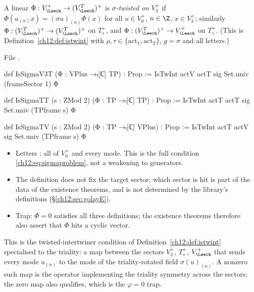 \begin{definition}\label{ch12:def:issigma}
A linear $\Phi:V_\Leech^+\to(V_\Leech^T)^+$ is \emph{$\sigma$-twisted on $V_3^+$} if
$\Phi(u_{(n)}x)=(\sigma u)_{(n)}\Phi(x)$ for all $u\in V_0^+$, $n\in\Z$, $x\in V_3^+$; similarly
$\Phi:(V_\Leech^T)^+\to(V_\Leech^T)^+$ on $T_s^+$, and $\Phi:(V_\Leech^T)^+\to V_\Leech^+$ on $T_s^+$.  (This is
Definition~\ref{ch12:def:istwint} with $\rho,\tau\in\{\mathrm{act}_V,\mathrm{act}_T\}$, $g=\sigma$ and all letters.)
\end{definition}
File .
\begin{leancode}
def IsSigmaV3T (Φ : VPlus →ₗ[ℂ] TP) : Prop :=
  IsTwInt actV actT sig Set.univ (frameSector 1) Φ

def IsSigmaTT (s : ZMod 2) (Φ : TP →ₗ[ℂ] TP) : Prop :=
  IsTwInt actT actT sig Set.univ (TPframe s) Φ

def IsSigmaTV (s : ZMod 2) (Φ : TP →ₗ[ℂ] VPlus) : Prop :=
  IsTwInt actT actV sig Set.univ (TPframe s) Φ
\end{leancode}
\begin{dictionary}
\begin{itemize}
\item Letters : all of $V_0^+$ and every mode.  This is the full condition
  \eqref{ch12:eq:sigmaproblem}, not a weakening to generators.
\item The definition does not fix the target sector; which sector is hit is part of the data of the
  existence theorems, and is not determined by the library's definitions (\S\ref{ch12:sec:golayE}).
\item Trap: $\Phi=0$ satisfies all three definitions; the existence theorems therefore also assert that
  $\Phi$ hits a cyclic vector.
\end{itemize}
\end{dictionary}

\begin{physics}
This is the twisted-intertwiner condition of Definition~\ref{ch12:def:istwint} specialised to the triality: a map between the sectors $V_3^+$, $T_s^+$, $V_\Leech^+$ that sends every mode $u_{(n)}$ to the mode of the triality-rotated field $\sigma(u)_{(n)}$. A nonzero such map is the operator implementing the triality symmetry across the sectors; the zero map also qualifies, which is the $\varphi=0$ trap.
\end{physics}

